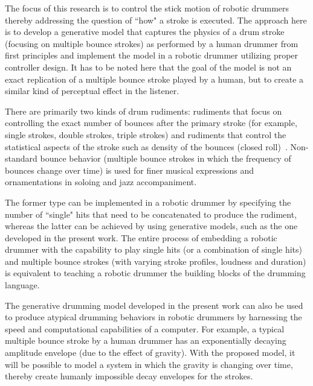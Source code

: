 \documentclass[final,1p,times]{elsarticle}
\begin{document}
The focus of this research is to control the stick motion of robotic drummers thereby addressing the question of ``how" a stroke is executed. The approach here is to develop a generative model that captures the physics of a drum stroke (focusing on multiple bounce strokes) as performed by a human drummer from first principles and implement the model in a robotic drummer utilizing proper controller design. It has to be noted here that the goal of the model is not an exact replication of a multiple bounce stroke played by a human, but to create a similar kind of perceptual effect in the listener. 

There are primarily two kinds of drum rudiments: rudiments that focus on controlling the exact number of bounces after the primary stroke (for example, single strokes, double strokes, triple strokes) and rudiments that control the statistical aspects of the stroke such as density of the bounces (closed roll)~\cite{rich2005buddy}. Non-standard bounce behavior (multiple bounce strokes in which the frequency of bounces change over time) is used for finer musical expressions and ornamentations in soloing and jazz accompaniment.

The former type can be implemented in a robotic drummer by specifying the number of ``single" hits that need to be concatenated to produce
the rudiment, whereas the latter can be achieved by using generative
models, such as the one developed in the present work. The entire process of embedding a robotic drummer with the capability to play single hits (or a combination of single hits) and multiple bounce strokes (with varying stroke profiles, loudness and duration) is equivalent to teaching a robotic drummer the building blocks of the drumming language.

The generative drumming model developed in the present work can also be used to produce atypical drumming behaviors in robotic drummers	by harnessing the speed and computational capabilities of a computer. For
example, a typical multiple bounce stroke by a human drummer has an exponentially decaying amplitude envelope (due to the effect of gravity). With the proposed model, it will be possible to model a system in which the gravity is changing over time, thereby create humanly impossible decay envelopes for the strokes. 
\end{document}
